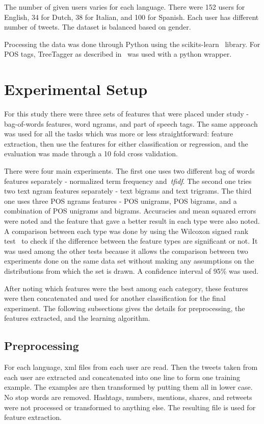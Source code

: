 \documentclass[a4paper]{llncs}
\begin{document}
The number of given users varies for each language. There were 152 users for English, 34 for Dutch, 38 for Italian, and 100 for Spanish. Each user has different number of tweets. The dataset is balanced based on gender. 

Processing the data was done through Python using the scikits-learn~\cite{scikit-learn} library. For POS tags, TreeTagger as described in~\cite{schmid1994probabilistic} was used with a python wrapper. 

\section{Experimental Setup}
For this study there were three sets of features that were placed under study - bag-of-words features, word ngrams, and  part of speech tags. The same approach was used for all the tasks which was more or less straightforward: feature extraction, then use the features for either classification or regression, and the evaluation was made through a 10 fold cross validation.

There were four main experiments. The first one uses two different bag of words features separately - normalized term frequency and~\textit{tfidf}. The second one tries two text ngram features separately - text bigrams and text trigrams. The third one uses three POS ngrams features - POS unigrams, POS bigrams, and a combination of POS unigrams and bigrams. Accuracies and mean squared errors were noted and the feature that gave a better result in each type were also noted. A comparison between each type was done by using the Wilcoxon signed rank test~\cite{wilcoxon1945individual} to check if the difference between the feature types are significant or not. It was used among the other tests because it allows the comparison between two experiments done on the same data set without making any assumptions on the distributions from which the set is drawn. A confidence interval of 95\% was used.

After noting which features were the best among each category, these features were then concatenated and used for another classification for the final experiment. The following subsections gives the details for preprocessing, the features extracted, and the learning algorithm.
\subsection{Preprocessing}
For each language, xml files from each user are read. Then the tweets taken from each user are extracted and concatenated into one line to form one training example. The examples are then transformed by putting them all in lower case. No stop words are removed. Hashtags, numbers, mentions, shares, and retweets were not processed or transformed to anything else. The resulting file is used for feature extraction.  
\end{document}
